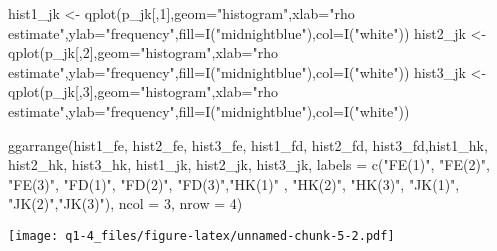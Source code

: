 \documentclass[
]{article}
\newenvironment{Shaded}{\begin{snugshade}}{\end{snugshade}}
\newcommand{\AttributeTok}[1]{\textcolor[rgb]{0.77,0.63,0.00}{#1}}
\newcommand{\DecValTok}[1]{\textcolor[rgb]{0.00,0.00,0.81}{#1}}
\newcommand{\FunctionTok}[1]{\textcolor[rgb]{0.00,0.00,0.00}{#1}}
\newcommand{\NormalTok}[1]{#1}
\newcommand{\OtherTok}[1]{\textcolor[rgb]{0.56,0.35,0.01}{#1}}
\newcommand{\StringTok}[1]{\textcolor[rgb]{0.31,0.60,0.02}{#1}}
\begin{document}
\begin{Shaded}
\begin{Highlighting}[]
\NormalTok{hist1\_jk }\OtherTok{\textless{}{-}} \FunctionTok{qplot}\NormalTok{(p\_jk[,}\DecValTok{1}\NormalTok{],}\AttributeTok{geom=}\StringTok{"histogram"}\NormalTok{,}\AttributeTok{xlab=}\StringTok{"rho estimate"}\NormalTok{,}\AttributeTok{ylab=}\StringTok{"frequency"}\NormalTok{,}\AttributeTok{fill=}\FunctionTok{I}\NormalTok{(}\StringTok{"midnightblue"}\NormalTok{),}\AttributeTok{col=}\FunctionTok{I}\NormalTok{(}\StringTok{"white"}\NormalTok{)) }
\NormalTok{hist2\_jk }\OtherTok{\textless{}{-}} \FunctionTok{qplot}\NormalTok{(p\_jk[,}\DecValTok{2}\NormalTok{],}\AttributeTok{geom=}\StringTok{"histogram"}\NormalTok{,}\AttributeTok{xlab=}\StringTok{"rho estimate"}\NormalTok{,}\AttributeTok{ylab=}\StringTok{"frequency"}\NormalTok{,}\AttributeTok{fill=}\FunctionTok{I}\NormalTok{(}\StringTok{"midnightblue"}\NormalTok{),}\AttributeTok{col=}\FunctionTok{I}\NormalTok{(}\StringTok{"white"}\NormalTok{)) }
\NormalTok{hist3\_jk }\OtherTok{\textless{}{-}} \FunctionTok{qplot}\NormalTok{(p\_jk[,}\DecValTok{3}\NormalTok{],}\AttributeTok{geom=}\StringTok{"histogram"}\NormalTok{,}\AttributeTok{xlab=}\StringTok{"rho estimate"}\NormalTok{,}\AttributeTok{ylab=}\StringTok{"frequency"}\NormalTok{,}\AttributeTok{fill=}\FunctionTok{I}\NormalTok{(}\StringTok{"midnightblue"}\NormalTok{),}\AttributeTok{col=}\FunctionTok{I}\NormalTok{(}\StringTok{"white"}\NormalTok{)) }

\FunctionTok{ggarrange}\NormalTok{(hist1\_fe, hist2\_fe, hist3\_fe, hist1\_fd, hist2\_fd, hist3\_fd,hist1\_hk, }
\NormalTok{          hist2\_hk, hist3\_hk, hist1\_jk, hist2\_jk, hist3\_jk,}
          \AttributeTok{labels =} \FunctionTok{c}\NormalTok{(}\StringTok{"FE(1)"}\NormalTok{, }\StringTok{"FE(2)"}\NormalTok{, }\StringTok{"FE(3)"}\NormalTok{, }\StringTok{"FD(1)"}\NormalTok{, }\StringTok{"FD(2)"}\NormalTok{, }\StringTok{"FD(3)"}\NormalTok{,}\StringTok{"HK(1)"}
\NormalTok{                     , }\StringTok{"HK(2)"}\NormalTok{,  }\StringTok{"HK(3)"}\NormalTok{, }\StringTok{"JK(1)"}\NormalTok{, }\StringTok{"JK(2)"}\NormalTok{,}\StringTok{"JK(3)"}\NormalTok{),}
          \AttributeTok{ncol =} \DecValTok{3}\NormalTok{, }\AttributeTok{nrow =} \DecValTok{4}\NormalTok{)}
\end{Highlighting}
\end{Shaded}

\texttt{[image: q1-4\_files/figure-latex/unnamed-chunk-5-2.pdf]}
\end{document}
